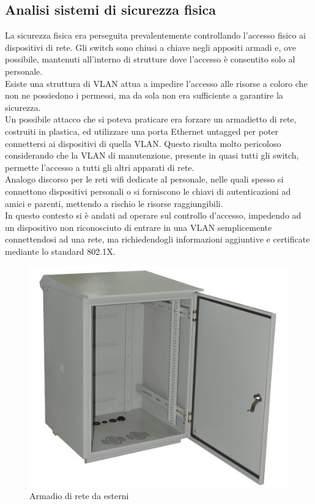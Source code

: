 \documentclass[Realizzazione.tex]{subfiles}
\begin{document}
\subsection{Analisi sistemi di sicurezza fisica}
La sicurezza fisica era perseguita prevalentemente controllando l'accesso fisico ai dispositivi di rete. Gli switch sono chiusi a chiave negli appositi armadi e, ove possibile, mantenuti all'interno di strutture dove l'accesso è consentito solo al personale. \\
Esiste una struttura di VLAN attua a impedire l'accesso alle risorse a coloro che non ne possiedono i permessi, ma da sola non era sufficiente a garantire la sicurezza. \\
Un possibile attacco che si poteva praticare era forzare un armadietto di rete, costruiti in plastica, ed utilizzare una porta Ethernet untagged per poter connettersi ai dispositivi di quella VLAN. Questo risulta molto pericoloso considerando che la VLAN di manutenzione, presente in quasi tutti gli switch, permette l'accesso a tutti gli altri apparati di rete. \\
Analogo discorso per le reti wifi dedicate al personale, nelle quali spesso si connettono dispositivi personali o si forniscono le chiavi di autenticazioni ad amici e parenti, mettendo a rischio le risorse raggiungibili. \\
In questo contesto si è andati ad operare sul controllo d'accesso, impedendo ad un dispositivo non riconosciuto di entrare in una VLAN semplicemente connettendosi ad una rete, ma richiedendogli informazioni aggiuntive e certificate mediante lo standard 802.1X.

\begin{figure}[H]
	\centering
	\includegraphics[width=0.5\linewidth]{"images/Outdoor rack"}
	\caption{Armadio di rete da esterni}
	\label{fig:Armadio di rete da esterni}
\end{figure}
\end{document}
